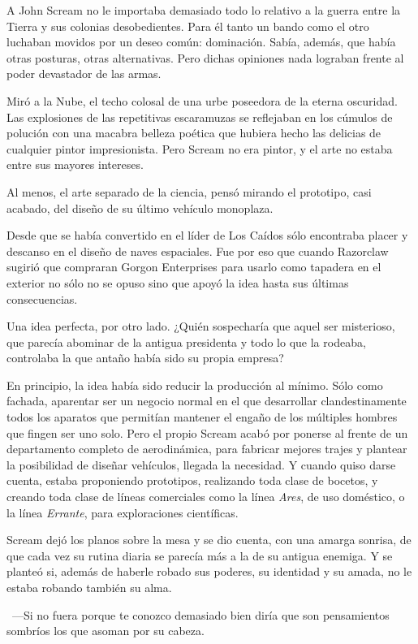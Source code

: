 A John Scream no le importaba demasiado todo lo relativo a la guerra entre la Tierra y sus colonias desobedientes. Para él tanto un bando como el otro luchaban movidos por un deseo común: dominación. Sabía, además, que había otras posturas, otras alternativas. Pero dichas opiniones nada lograban frente al poder devastador de las armas.

Miró a la Nube, el techo colosal de una urbe poseedora de la eterna oscuridad. Las explosiones de las repetitivas escaramuzas se reflejaban en los cúmulos de polución con una macabra belleza poética que hubiera hecho las delicias de cualquier pintor impresionista. Pero Scream no era pintor, y el arte no estaba entre sus mayores intereses.

Al menos, el arte separado de la ciencia, pensó mirando el prototipo, casi acabado, del diseño de su último vehículo monoplaza.

Desde que se había convertido en el líder de Los Caídos sólo encontraba placer y descanso en el diseño de naves espaciales. Fue por eso que cuando Razorclaw sugirió que compraran Gorgon Enterprises para usarlo como tapadera en el exterior no sólo no se opuso sino que apoyó la idea hasta sus últimas consecuencias.

Una idea perfecta, por otro lado. ¿Quién sospecharía que aquel ser misterioso, que parecía abominar de la antigua presidenta y todo lo que la rodeaba, controlaba la que antaño había sido su propia empresa?

En principio, la idea había sido reducir la producción al mínimo. Sólo como fachada, aparentar ser un negocio normal en el que desarrollar clandestinamente todos los aparatos que permitían mantener el engaño de los múltiples hombres que fingen ser uno solo. Pero el propio Scream acabó por ponerse al frente de un departamento completo de aerodinámica, para fabricar mejores trajes y plantear la posibilidad de diseñar vehículos, llegada la necesidad. Y cuando quiso darse cuenta, estaba proponiendo prototipos, realizando toda clase de bocetos, y creando toda clase de líneas comerciales como la línea \emph{Ares}, de uso doméstico, o la línea \emph{Errante}, para exploraciones científicas.

Scream dejó los planos sobre la mesa y se dio cuenta, con una amarga sonrisa, de que cada vez su rutina diaria se parecía más a la de su antigua enemiga. Y se planteó si, además de haberle robado sus poderes, su identidad y su amada, no le estaba robando también su alma.

~---Si no fuera porque te conozco demasiado bien diría que son pensamientos sombríos los que asoman por su cabeza.

